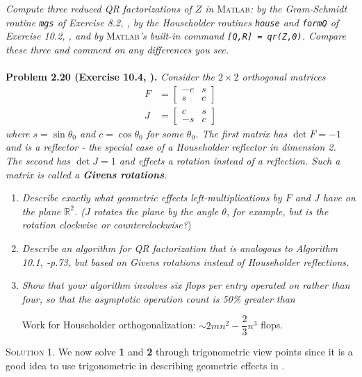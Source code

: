\documentclass[a4paper,oneside]{book}
\numberwithin{equation}{chapter}
\begin{document}
\textit{Compute three reduced QR factorizations of $Z$ in}\textsc{ Matlab}\textit{: by the Gram-Schmidt routine \texttt{mgs} of Exercise 8.2, \cite{1}, by the Householder routines \texttt{house} and \texttt{formQ} of Exercise 10.2, \cite{1}, and by}\textsc{ Matlab}\textit{'s built-in command \texttt{[Q,R] = qr(Z,0)}. Compare these three and comment on any differences you see.}\\
\\
\textbf{Problem 2.20 (Exercise 10.4, \cite{1}).} \textit{Consider the $2 \times 2$ orthogonal matrices}
\begin{align}
F& = \left[ {\begin{array}{*{20}{c}}
{ - c}&s\\
s&c
\end{array}} \right]\\
J &= \left[ {\begin{array}{*{20}{c}}
c&s\\
{ - s}&c
\end{array}} \right]
\end{align}
\textit{where $s =\sin \theta _0$ and $c=\cos \theta _0 $ for some $\theta _0$. The first matrix has $\det F=-1$ and is a reflector - the special case of a Householder reflector in dimension 2. The second has  $\det J=1$ and effects a rotation instead of a reflection. Such a matrix is called a \textbf{Givens rotations}.}
\begin{enumerate}
\item \textit{Describe exactly what geometric effects left-multiplications by $F$ and $J$ have on the plane $\mathbb{R}^2$. ($J$ rotates the plane by the angle $\theta$, for example, but is the rotation clockwise or counterclockwise?})
\item \textit{Describe an algorithm for QR factorization that is analogous to Algorithm 10.1, \cite{1}-p.73, but based on Givens rotations instead of Householder reflections.}
\item \textit{Show that your algorithm involves six flops per entry operated on rather than four, so that the asymptotic operation count is 50\% greater than}
\begin{center}
Work for Householder orthogonalization: $\sim 2m{n^2} - \dfrac{2}{3}{n^3}$ flops.
\end{center}
\end{enumerate}
\textsc{Solution 1.} We now solve \textbf{1} and \textbf{2} through trigonometric view points since it is a good idea to use trigonometric in describing geometric effects in \cite{1}.\\ 
\end{document}

